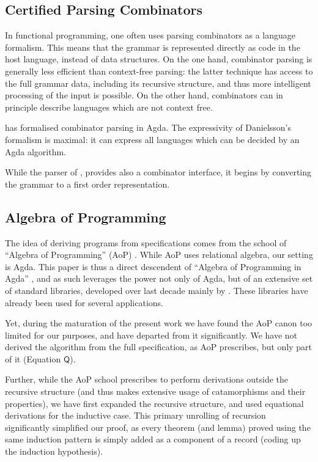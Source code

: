\documentclass{CSML}
\numberwithin{theorem}{section}
\newcommand{\Conid}[1]{\mathit{#1}}
\renewcommand\Conid[1]{\ensuremath{\mathsf{#1}}}
\begin{document}
\subsection{Certified Parsing Combinators}
In functional programming, one often uses parsing combinators as a
language formalism.  This means that the grammar is represented
directly as code in the host language, instead of data structures.
On the one hand, combinator parsing is generally less efficient than
context-free parsing: the latter technique has access to the full
grammar data, including its recursive structure, and thus more
intelligent processing of the input is possible. On the other hand,
combinators can in principle describe languages which are not context
free.

\citet{danielsson_total_2010} has formalised combinator parsing in
Agda.  The expressivity of Danielsson's formalism is maximal: it can
express all languages which can be decided by an Agda algorithm.

While the parser of \citep{ridge_simple_2014}, provides also a
combinator interface, it begins by converting the grammar to a first
order representation.

\subsection{Algebra of Programming}

The idea of deriving programs from specifications comes from the school of
``Algebra of Programming'' (AoP) \citep{birddemoor96}. While AoP uses
relational algebra, our setting is Agda. This paper is thus a direct
descendent of ``Algebra of Programming in Agda''
\citep{mukojansson08:mpc:dcc, MuKoJansson2009AoPA}, and as such leverages the power not only
of Agda, but of an extensive set of standard libraries, developed over
last decade mainly by \citet{danielsson_agda_2013}. These libraries
have already been used for several applications.

Yet, during the maturation of the present work we have found the AoP
canon too limited for our purposes, and have departed from it
significantly.
We have not derived the algorithm from the full specification, as AoP
prescribes, but only part of it (Equation \ensuremath{\Conid{Q}}).

Further, while the AoP school prescribes to perform derivations
outside the recursive structure (and thus makes extensive usage of
catamorphisms and their properties), we have first expanded the
recursive structure, and used equational derivations for the inductive
case. This primary unrolling of recursion significantly simplified our
proof, as every theorem (and lemma) proved using the same induction
pattern is simply added as a component of a record (coding up the
induction hypothesis).
\end{document}
